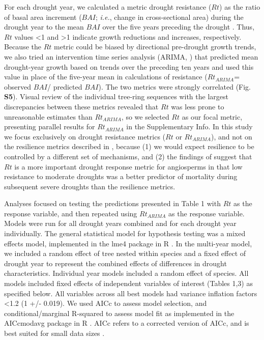 \documentclass[
]{article}
\begin{document}
For each drought year, we calculated a metric drought resistance
(\(Rt\)) as the ratio of basal area increment (\(BAI\); \emph{i.e.},
change in cross-sectional area) during the drought year to the mean
\(BAI\) over the five years preceding the drought
\citep{lloret_components_2011}. Thus, \(Rt\) values \textless1 and
\textgreater1 indicate growth reductions and increases, respectively.
Because the \(Rt\) metric could be biased by directional pre-drought
growth trends, we also tried an intervention time series analysis
(ARIMA, \citep{R-forecast}) that predicted mean drought-year growth
based on trends over the preceding ten years and used this value in
place of the five-year mean in calculations of resistance
(\(Rt_{ARIMA}\)= observed \(BAI\)/ predicted \(BAI\)). The two metrics
were strongly correlated (Fig. \textbf{S5}). Visual review of the
individual tree-ring sequences with the largest discrepancies between
these metrics revealed that \(Rt\) was less prone to unreasonable
estimates than \(Rt_{ARIMA}\), so we selected \(Rt\) as our focal
metric, presenting parallel results for \(Rt_{ARIMA}\) in the
Supplementary Info. In this study we focus exclusively on drought
resistance metrics (\(Rt\) or \(Rt_{ARIMA}\)), and not on the resilience
metrics described in \citet{lloret_components_2011}, because (1) we
would expect resilience to be controlled by a different set of
mechanisms, and (2) the findings of \citep{desoto_low_2020} suggest that
\(Rt\) is a more important drought response metric for angiosperms in
that low resistance to moderate droughts was a better predictor of
mortality during subsequent severe droughts than the resilience metrics.

Analyses focused on testing the predictions presented in Table 1 with
\(Rt\) as the response variable, and then repeated using \(Rt_{ARIMA}\)
as the response variable. Models were run for all drought years combined
and for each drought year individually. The general statistical model
for hypothesis testing was a mixed effects model, implemented in the
lme4 package in R \citep{R-lme4}. In the multi-year model, we included a
random effect of tree nested within species and a fixed effect of
drought year to represent the combined effects of differences in drought
characteristics. Individual year models included a random effect of
species. All models included fixed effects of independent variables of
interest (Tables 1,3) as specified below. All variables across all best
models had variance inflation factors \textless1.2 (1 +/- 0.019). We
used AICc to assess model selection, and conditional/marginal R-squared
to assess model fit as implemented in the AICcmodavg package in R
\citep{R-AICcmodavg}. AICc refers to a corrected version of AICc, and is
best suited for small data sizes \citep[see][]{brewer_relative_2016}.
\end{document}
